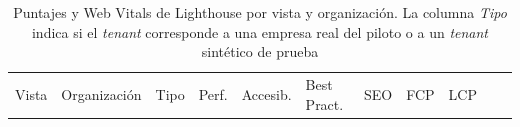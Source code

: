 \begin{longtable}[]{@{}
  >{\raggedright\arraybackslash}p{}
  >{\raggedright\arraybackslash}p{}
  >{\raggedright\arraybackslash}p{}
  >{\raggedright\arraybackslash}p{}
  >{\raggedright\arraybackslash}p{}
  >{\raggedright\arraybackslash}p{}
  >{\raggedright\arraybackslash}p{}
  >{\raggedright\arraybackslash}p{}
  >{\raggedright\arraybackslash}p{}
  >{\raggedright\arraybackslash}p{}
  >{\raggedright\arraybackslash}p{}@{}}
\caption[Puntajes y Web Vitals de Lighthouse por vista y organización]{Puntajes y Web Vitals de Lighthouse por vista y organización. La columna \emph{Tipo} indica si el \emph{tenant} corresponde a una empresa real del piloto o a un \emph{tenant} sintético de prueba}\tabularnewline
\toprule\noalign{}
\begin{minipage}[b]{\linewidth}\raggedright
Vista
\end{minipage} & \begin{minipage}[b]{\linewidth}\raggedright
Organización
\end{minipage} & \begin{minipage}[b]{\linewidth}\raggedright
Tipo
\end{minipage} & \begin{minipage}[b]{\linewidth}\raggedright
Perf.
\end{minipage} & \begin{minipage}[b]{\linewidth}\raggedright
Accesib.
\end{minipage} & \begin{minipage}[b]{\linewidth}\raggedright
Best Pract.
\end{minipage} & \begin{minipage}[b]{\linewidth}\raggedright
SEO
\end{minipage} & \begin{minipage}[b]{\linewidth}\raggedright
FCP
\end{minipage} & \begin{minipage}[b]{\linewidth}\raggedright
LCP
\end{minipage} & \begin{minipage}[b]{\linewidth}\raggedright

\end{minipage}
\end{longtable}
